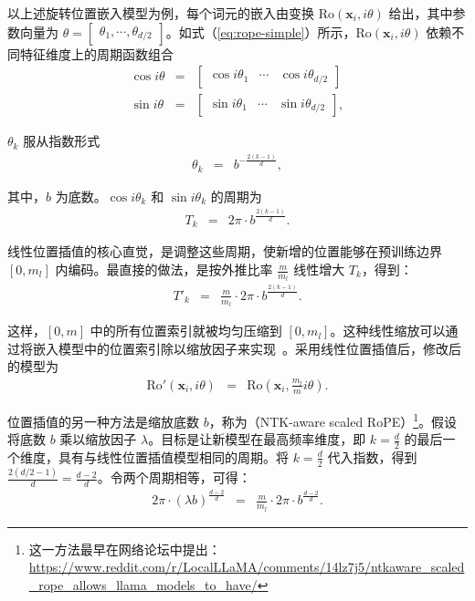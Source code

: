 以上述旋转位置嵌入模型为例，每个词元的嵌入由变换 $\mathrm{Ro}(\mathbf{x}_i, i\theta)$ 给出，其中参数向量为 $\theta = \begin{bmatrix} \theta_1, \cdots, \theta_{d/2}\end{bmatrix}$。如式（\ref{eq:rope-simple}）所示，$\mathrm{Ro}(\mathbf{x}_i, i\theta)$ 依赖不同特征维度上的周期函数组合
\begin{eqnarray}
\cos i\theta & = & \begin{bmatrix} \cos i\theta_1 & \cdots & \cos i\theta_{d/2} \end{bmatrix} \label{rope-cos-theta} \\
\sin i\theta & = & \begin{bmatrix} \sin i\theta_1 & \cdots & \sin i\theta_{d/2} \end{bmatrix} \label{rope-sin-theta},
\end{eqnarray}

\noindent $\theta_k$ 服从指数形式
\begin{eqnarray}
\theta_k & = & b^{-\frac{2(k-1)}{d}},
\end{eqnarray}

\noindent 其中，$b$ 为底数。$\cos i\theta_k$ 和 $\sin i\theta_k$ 的周期为
\begin{eqnarray}
T_k & = & 2\pi \cdot b^{\frac{2(k-1)}{d}}.
\end{eqnarray}

线性位置插值的核心直觉，是调整这些周期，使新增的位置能够在预训练边界 $[0,m_l]$ 内编码。最直接的做法，是按外推比率 $\frac{m}{m_l}$ 线性增大 $T_k$，得到：
\begin{eqnarray}
T'_k & = & \frac{m}{m_l} \cdot 2\pi \cdot b^{\frac{2(k-1)}{d}}.
\end{eqnarray}

\noindent 这样，$[0, m]$ 中的所有位置索引就被均匀压缩到 $[0, m_l]$。这种线性缩放可以通过将嵌入模型中的位置索引除以缩放因子来实现~\cite{chen-etal:2023extending}。采用线性位置插值后，修改后的模型为
\begin{eqnarray}
\mathrm{Ro}'(\mathbf{x}_i,i\theta) & = & \mathrm{Ro} \left(\mathbf{x}_i,\frac{m_l}{m} i\theta \right).
\end{eqnarray}

位置插值的另一种方法是缩放底数 $b$，称为（NTK-aware scaled RoPE）\footnote{这一方法最早在网络论坛中提出：\url{https://www.reddit.com/r/LocalLLaMA/comments/14lz7j5/ntkaware_scaled_rope_allows_llama_models_to_have/}}。假设将底数 $b$ 乘以缩放因子 $\lambda$。目标是让新模型在最高频率维度，即 $k = \frac{d}{2}$ 的最后一个维度，具有与线性位置插值模型相同的周期。将 $k = \frac{d}{2}$ 代入指数，得到 $\frac{2(d/2-1)}{d} = \frac{d-2}{d}$。令两个周期相等，可得：
\begin{eqnarray}
2\pi \cdot (\lambda b)^{\frac{d-2}{d}} & = & \frac{m}{m_l} \cdot 2\pi \cdot b^{\frac{d-2}{d}}.
\end{eqnarray}

